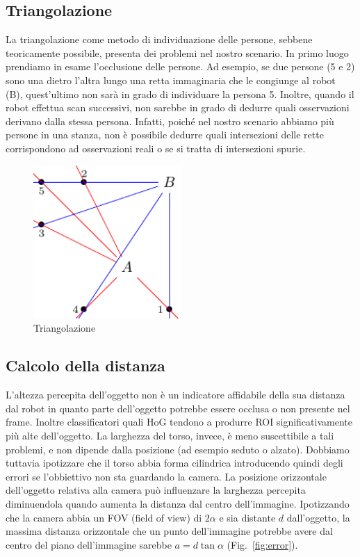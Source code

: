 \documentclass[a4paper]{article}
\begin{document}
	\subsection{Triangolazione}\label{subsec:Triangolazione}
	La triangolazione come metodo di individuazione delle persone, sebbene teoricamente possibile, presenta dei problemi nel nostro scenario. In primo luogo prendiamo in esame l'occlusione delle persone. Ad esempio, se due persone (5 e 2) sono una dietro l'altra lungo una retta immaginaria che le congiunge al robot (B), quest'ultimo non sarà in grado di individuare la persona 5. Inoltre, quando il robot effettua scan successivi, non sarebbe in grado di dedurre quali osservazioni derivano dalla stessa persona. Infatti, poiché nel nostro scenario abbiamo più persone in una stanza, non è possibile dedurre quali intersezioni delle rette corrispondono ad osservazioni reali o se si tratta di intersezioni spurie. 
	
	\begin{figure}[H]
		\centering
		\includegraphics[width=0.5\textwidth]{./img/ideal_object_triangulation.pdf}
		\caption{Triangolazione}
		\label{fig:triangulation}
	\end{figure}
	
	\subsection{Calcolo della distanza}\label{subsec:Calcolo-della-distanza}
	
	L'altezza percepita dell'oggetto non è un indicatore affidabile della sua distanza dal robot in quanto parte dell'oggetto potrebbe essere occlusa o non presente nel frame. Inoltre classificatori quali HoG tendono a produrre ROI significativamente più alte dell'oggetto. La larghezza del torso, invece, è meno suscettibile a tali problemi, e non dipende dalla posizione (ad esempio seduto o alzato). Dobbiamo tuttavia ipotizzare che il torso abbia forma cilindrica introducendo quindi degli errori se l'obbiettivo non sta guardando la camera.	La posizione orizzontale dell'oggetto relativa alla camera può influenzare la larghezza percepita diminuendola quando aumenta la distanza dal centro dell'immagine. Ipotizzando che la camera abbia un FOV (field of view) di $2\alpha$ e sia distante $d$ dall'oggetto, la massima distanza orizzontale che un punto dell'immagine potrebbe avere dal centro del piano dell'immagine sarebbe $a = d \tan \alpha$ (Fig.~\ref{fig:error}).
	
\end{document}
